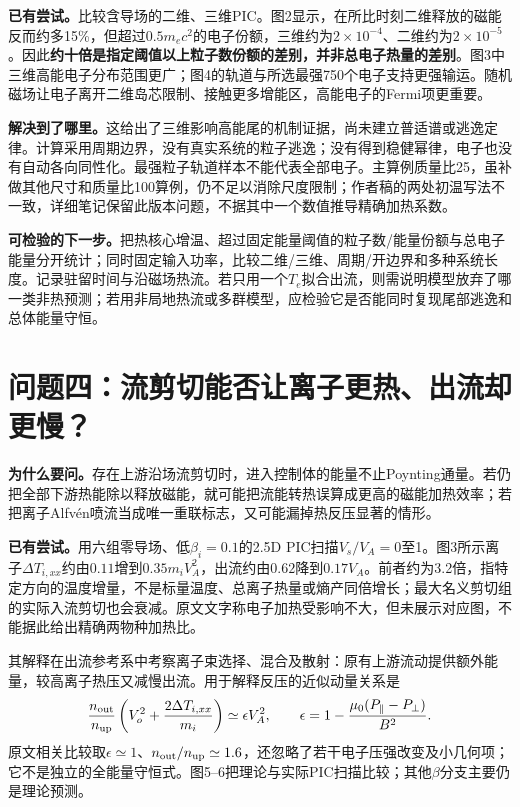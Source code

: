 \textbf{已有尝试。}\citet{Dahlin2015ThreeD}比较含导场的二维、三维PIC。图2显示，在所比时刻二维释放的磁能反而约多15\%，但超过$0.5m_ec^2$的电子份额，三维约为$2\times10^{-4}$、二维约为$2\times10^{-5}$。因此\textbf{约十倍是指定阈值以上粒子数份额的差别，并非总电子热量的差别}。图3中三维高能电子分布范围更广；图4的轨道与所选最强750个电子支持更强输运。随机磁场让电子离开二维岛芯限制、接触更多增能区，高能电子的Fermi项更重要。\citep{Dahlin2015ThreeD}

\textbf{解决到了哪里。}这给出了三维影响高能尾的机制证据，尚未建立普适谱或逃逸定律。计算采用周期边界，没有真实系统的粒子逃逸；没有得到稳健幂律，电子也没有自动各向同性化。最强粒子轨道样本不能代表全部电子。主算例质量比25，虽补做其他尺寸和质量比100算例，仍不足以消除尺度限制；作者稿的两处初温写法不一致，详细笔记保留此版本问题，不据其中一个数值推导精确加热系数。

\textbf{可检验的下一步。}把热核心增温、超过固定能量阈值的粒子数/能量份额与总电子能量分开统计；同时固定输入功率，比较二维/三维、周期/开边界和多种系统长度。记录驻留时间与沿磁场热流。若只用一个$T_e$拟合出流，则需说明模型放弃了哪一类非热预测；若用非局地热流或多群模型，应检验它是否能同时复现尾部逃逸和总体能量守恒。


\section{问题四：流剪切能否让离子更热、出流却更慢？}
\textbf{为什么要问。}存在上游沿场流剪切时，进入控制体的能量不止Poynting通量。若仍把全部下游热能除以释放磁能，就可能把流能转热误算成更高的磁能加热效率；若把离子Alfv\'en喷流当成唯一重联标志，又可能漏掉热反压显著的情形。

\textbf{已有尝试。}\citet{F627}用六组零导场、低$\beta_i=0.1$的2.5D PIC扫描$V_s/V_A=0$至1。图3所示离子$\Delta T_{i,xx}$约由$0.11$增到$0.35m_iV_A^2$，出流约由$0.62$降到$0.17V_A$。前者约为3.2倍，指特定方向的温度增量，不是标量温度、总离子热量或熵产同倍增长；最大名义剪切组的实际入流剪切也会衰减。原文文字称电子加热受影响不大，但未展示对应图，不能据此给出精确两物种加热比。

其解释在出流参考系中考察离子束选择、混合及散射：原有上游流动提供额外能量，较高离子热压又减慢出流。用于解释反压的近似动量关系是
\begin{equation}
 \frac{n_{\rm out}}{n_{\rm up}}
 \left(V_o^2+\frac{2\Delta T_{i,xx}}{m_i}\right)
 \simeq\epsilon V_A^2,\qquad
 \epsilon=1-\frac{\mu_0(P_\parallel-P_\perp)}{B^2}.
 \label{eq:question-shear}
\end{equation}
原文相关比较取$\epsilon\simeq1$、$n_{\rm out}/n_{\rm up}\simeq1.6$，还忽略了若干电子压强改变及小几何项；它不是独立的全能量守恒式。图5--6把理论与实际PIC扫描比较；其他$\beta$分支主要仍是理论预测。\citep{F627}

